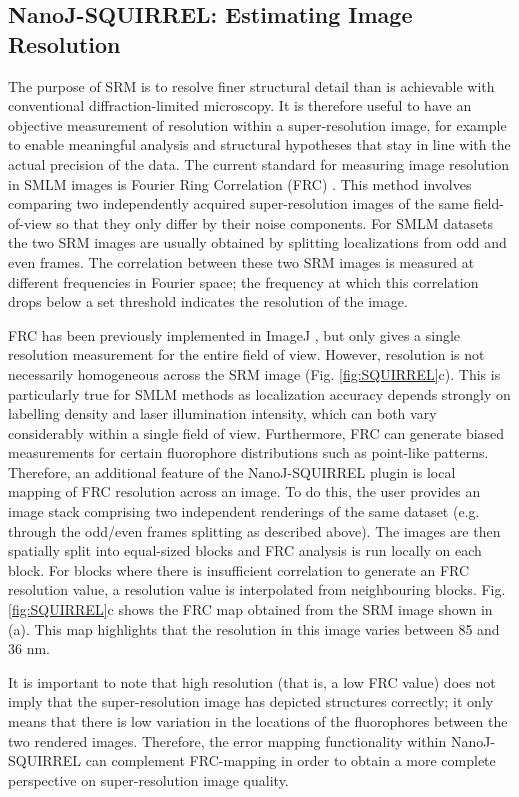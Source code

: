 \subsection*{NanoJ-SQUIRREL: Estimating Image Resolution}
 The purpose of SRM is to resolve finer structural detail than is achievable with conventional diffraction-limited microscopy. It is therefore useful to have an objective measurement of resolution within a super-resolution image, for example to enable meaningful analysis and structural hypotheses that stay in line with the actual precision of the data. The current standard for measuring image resolution in SMLM images is Fourier Ring Correlation (FRC) \cite{nieuwenhuizen2013measuring}. This method involves comparing two independently acquired super-resolution images of the same field-of-view so that they only differ by their noise components. For SMLM datasets the two SRM images are usually obtained by splitting localizations from odd and even frames. The correlation between these two SRM images is measured at different frequencies in Fourier space; the frequency at which this correlation drops below a set threshold indicates the resolution of the image.

 FRC has been previously implemented in ImageJ \cite{nieuwenhuizen2013measuring}, but only gives a single resolution measurement for the entire field of view. However, resolution is not necessarily homogeneous across the SRM image (Fig. \ref{fig:SQUIRREL}c). This is particularly true for SMLM methods as localization accuracy depends strongly on labelling density and laser illumination intensity, which can both vary considerably within a single field of view. Furthermore, FRC can generate biased measurements for certain fluorophore distributions such as point-like patterns. Therefore, an additional feature of the NanoJ-SQUIRREL plugin is local mapping of FRC resolution across an image. To do this, the user provides an image stack comprising two independent renderings of the same dataset (e.g. through the odd/even frames splitting as described above). The images are then spatially split into equal-sized blocks and FRC analysis is run locally on each block. For blocks where there is insufficient correlation to generate an FRC resolution value, a resolution value is interpolated from neighbouring blocks. Fig. \ref{fig:SQUIRREL}c shows the FRC map obtained from the SRM image shown in (a). This map highlights that the resolution in this image varies between 85 and 36 nm.

 It is important to note that high resolution (that is, a low FRC value) does not imply that the super-resolution image has depicted structures correctly; it only means that there is low variation in the locations of the fluorophores between the two rendered images. Therefore, the error mapping functionality within NanoJ-SQUIRREL can complement FRC-mapping in order to obtain a more complete perspective on super-resolution image quality.

